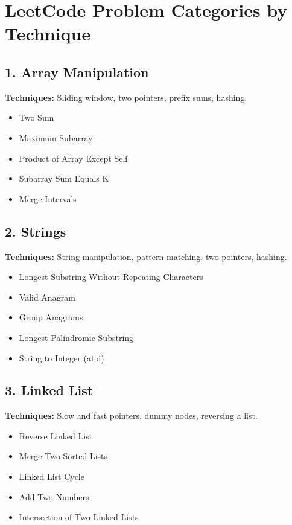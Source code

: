 \documentclass{article}
\begin{document}
\section*{LeetCode Problem Categories by Technique}

\subsection*{1. Array Manipulation}
\textbf{Techniques:} Sliding window, two pointers, prefix sums, hashing.
\begin{itemize}[noitemsep]
    \item Two Sum
    \item Maximum Subarray
    \item Product of Array Except Self
    \item Subarray Sum Equals K
    \item Merge Intervals
\end{itemize}

\subsection*{2. Strings}
\textbf{Techniques:} String manipulation, pattern matching, two pointers, hashing.
\begin{itemize}[noitemsep]
    \item Longest Substring Without Repeating Characters
    \item Valid Anagram
    \item Group Anagrams
    \item Longest Palindromic Substring
    \item String to Integer (atoi)
\end{itemize}

\subsection*{3. Linked List}
\textbf{Techniques:} Slow and fast pointers, dummy nodes, reversing a list.
\begin{itemize}[noitemsep]
    \item Reverse Linked List
    \item Merge Two Sorted Lists
    \item Linked List Cycle
    \item Add Two Numbers
    \item Intersection of Two Linked Lists
\end{itemize}
\end{document}
